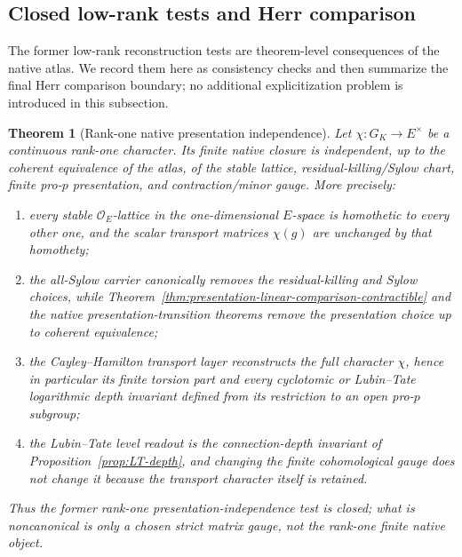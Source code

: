 \documentclass[11pt]{article}
\newtheorem{theorem}{Theorem}[section]
\theoremstyle{definition}
\begin{document}
\subsection{Closed low-rank tests and Herr comparison}

The former low-rank reconstruction tests are theorem-level consequences of the native atlas.  We record them here as consistency checks and then summarize the final Herr comparison boundary; no additional explicitization problem is introduced in this subsection.

\begin{theorem}[Rank-one native presentation independence]\label{thm:rankone-native-independence}
Let $\chi:G_K\to E^{\times}$ be a continuous rank-one character.  Its finite native closure is independent, up to the coherent equivalence of the atlas, of the stable lattice, residual-killing/Sylow chart, finite pro-$p$ presentation, and contraction/minor gauge.  More precisely:
\begin{enumerate}[label=\textnormal{(\roman*)}]
\item every stable $\mathcal O_E$-lattice in the one-dimensional $E$-space is homothetic to every other one, and the scalar transport matrices $\chi(g)$ are unchanged by that homothety;
\item the all-Sylow carrier canonically removes the residual-killing and Sylow choices, while Theorem~\ref{thm:presentation-linear-comparison-contractible} and the native presentation-transition theorems remove the presentation choice up to coherent equivalence;
\item the Cayley--Hamilton transport layer reconstructs the full character $\chi$, hence in particular its finite torsion part and every cyclotomic or Lubin--Tate logarithmic depth invariant defined from its restriction to an open pro-$p$ subgroup;
\item the Lubin--Tate level readout is the connection-depth invariant of Proposition~\ref{prop:LT-depth}, and changing the finite cohomological gauge does not change it because the transport character itself is retained.
\end{enumerate}
Thus the former rank-one presentation-independence test is closed; what is noncanonical is only a chosen strict matrix gauge, not the rank-one finite native object.
\end{theorem}
\end{document}
